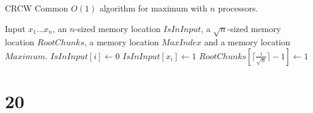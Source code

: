 \documentclass[letterpaper,notitlepage,twoside]{article}
\begin{document}
\begin{algorithm}[H]
  \begin{algorithmic}%
    \caption{CRCW Common $O(1)$ algorithm for maximum with $n$ processors.}
    \Require Input $x_1...x_n$, an $n$-sized memory location $IsInInput$, a $\sqrt{n}$-sized memory location $RootChunks$, a memory location $MaxIndex$ and a memory location $Maximum$.
    \State $IsInInput[i] \gets 0$ 
    \State $IsInInput[x_i] \gets 1$ 
        \State $RootChunks[\lceil \frac{i}{\sqrt{n}} \rceil -1] \gets 1$ 
    \EndIf
    
  \end{algorithmic}
\end{algorithm}

\section*{20}
\end{document}
